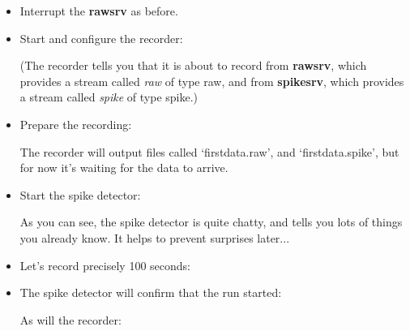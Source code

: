 \documentclass[12pt,oneside]{book}
\def\prog#1{{\bf #1}}
\def\stream#1{{\it #1}\xspace}
\def\streamtype#1{{\sc #1}\xspace}
\def\raw{\streamtype{raw}}
\def\spike{\streamtype{spike}}
\begin{document}
\begin{itemize}
\begin{quotation}
\end{quotation}
\item Interrupt the \prog{rawsrv} as before.
\item Start and configure the recorder:
\begin{quotation}
\uprompt{}
\end{quotation}
(The recorder tells you that it is about to record from \prog{rawsrv},
which provides a stream called \stream{raw} of type \raw, and from
\prog{spikesrv}, which provides a stream called \stream{spike} of type
\spike.)
\item Prepare the recording:
\begin{quotation}
\end{quotation}
The recorder will output files called `firstdata.raw', and
`firstdata.spike', but for now it's waiting for the data to arrive.
\item Start the spike detector:
\begin{quotation}
\end{quotation}
As you can see, the spike detector is quite chatty, and tells you lots
of things you already know. It helps to prevent surprises later...
\item Let's record precisely 100 seconds:
\begin{quotation}
\end{quotation}
\item The spike detector will confirm that the run started:
\begin{quotation}
\end{quotation}
As will the recorder:
\begin{quotation}

\end{quotation}
\end{itemize}
\end{document}

